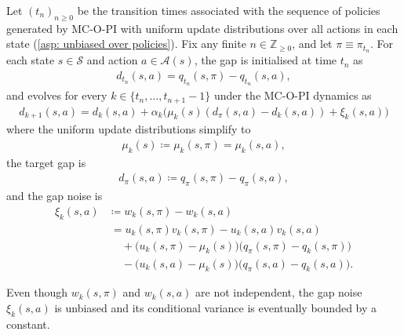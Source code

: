 \begin{definition}
\label{def: gap variables}
Let \((t_n)_{n \ge 0}\) be the transition times associated with the sequence of policies generated by MC-O-PI with uniform update distributions over all actions in each state (\autoref{asp: unbiased over policies}).
Fix any finite $n \in \mathbb Z_{\ge 0}$,
and let $\pi \equiv \pi_{t_n}$.
For each state $s \in \mathcal S$ and action $a \in \mathcal A(s)$, the gap is initialised at time $t_n$ as
\begin{align*}
d_{t_n}(s,a) = q_{t_n}(s,\pi) - q_{t_n}(s,a) ,
\end{align*}
and evolves for every $k \in \{t_n, \dots, t_{n+1}-1\}$ under the MC-O-PI dynamics as
\begin{align*}
d_{k+1}(s,a) = d_k(s,a) + \alpha_k \big( \mu_k(s)(d_\pi(s,a) - d_k(s,a)) + \xi_k(s,a) \big)
\end{align*}
where the uniform update distributions simplify to
\begin{align*}
    \mu_k(s) \coloneqq \mu_k(s,\pi) = \mu_k(s,a) ,
\end{align*}
the target gap is
\begin{align*}
    d_\pi(s,a) \coloneqq q_{\pi}(s,\pi) - q_{\pi}(s,a) ,
\end{align*}
and the gap noise is
\begin{align*}
    \xi_k(s,a) &\coloneqq
w_{k}(s,\pi) - w_{k}(s,a)
\\
\nonumber
&\: = u_k(s,\pi)v_k(s,\pi) - u_k(s,a) v_k(s,a)
\\
\nonumber
&\: \quad + \bigl( u_k(s,\pi) - \mu_k(s) \bigr) \bigl( q_\pi(s,\pi) - q_k(s,\pi) \bigr)
\\
\nonumber
&\: \quad - \bigl( u_k(s,a) - \mu_k(s) \bigr) \bigl( q_\pi(s,a) - q_k(s,a) \bigr) .
\end{align*}
\end{definition}
\vspace{-0.3cm}



Even though $w_k(s,\pi)$ and $w_k(s,a)$ are not independent, the gap noise $\xi_k(s,a)$ is unbiased and its conditional variance is eventually bounded by a constant.


